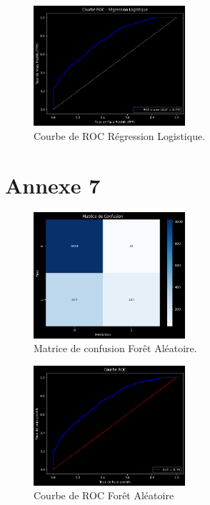 \begin{figure}[H]
\centering
\includegraphics[width=0.5\textwidth]{figures/ROCRL.png}
\caption{Courbe de ROC Régression Logistique.}
\end{figure}

\section*{Annexe 7}
\label{sec:annexe7}
\begin{figure}[H]
\centering
\includegraphics[width=0.5\textwidth]{figures/MatriceFoAl.png}
\caption{Matrice de confusion Forêt Aléatoire.}
\label{fig:annexe7}
\end{figure}


\begin{figure}[H]
\centering
\includegraphics[width=0.5\textwidth]{figures/ROCAL.png}
\caption{Courbe de ROC Forêt Aléatoire}
\end{figure}

